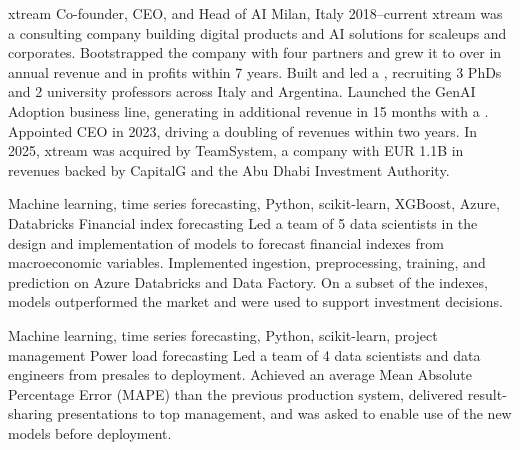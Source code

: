 \documentclass[10pt,a4paper]{article}
\begin{document}
\makecvheader[C]

\begin{cvskills}
\end{cvskills}

\begin{cventries}
  \cventry
    {xtream}
    {Co-founder, CEO, and Head of AI}
    {Milan, Italy}
    {2018--current}
    {xtream was a consulting company building digital products and AI solutions for scaleups and corporates. Bootstrapped the company with four partners and grew it to over  in annual revenue and  in profits within 7 years. Built and led a , recruiting 3 PhDs and 2 university professors across Italy and Argentina. Launched the GenAI Adoption business line, generating  in additional revenue in 15 months with a . Appointed CEO in 2023, driving a doubling of revenues within two years. In 2025, xtream was acquired by TeamSystem, a company with EUR 1.1B in revenues backed by CapitalG and the Abu Dhabi Investment Authority.}

  \cventry
    {Machine learning, time series forecasting, Python, scikit-learn, XGBoost, Azure, Databricks}
    {Financial index forecasting}
    {}
    {}
    {Led a team of 5 data scientists in the design and implementation of models to forecast financial indexes from macroeconomic variables. Implemented ingestion, preprocessing, training, and prediction on Azure Databricks and Data Factory. On a subset of the indexes, models outperformed the market and were used to support investment decisions.}

  \cventry
    {Machine learning, time series forecasting, Python, scikit-learn, project management}
    {Power load forecasting}
    {}
    {}
    {Led a team of 4 data scientists and data engineers from presales to deployment. Achieved an average Mean Absolute Percentage Error (MAPE)  than the previous production system, delivered result-sharing presentations to top management, and was asked to enable use of the new models before deployment.}


\end{cventries}
\end{document}
